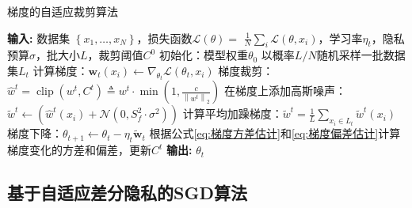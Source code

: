 \begin{algorithm}[!htb]
	\caption{梯度的自适应裁剪算法}
	\label{梯度的自适应裁剪算法}
	\begin{algorithmic}[1]
		\footnotesize
		\STATE \textbf{输入:} 数据集 $\left\{x_{1}, \ldots, x_{N}\right\}$，损失函数$\mathcal{L}(\theta)=$ $\frac{1}{N} \sum_{i} \mathcal{L}\left(\theta, x_{i}\right)$，学习率$\eta_{t}$，隐私预算$\sigma$，批大小$L$，裁剪阈值$C^{0}$
		\STATE 初始化：模型权重$\theta_{0}$
			\STATE 以概率$L / N$随机采样一批数据集$L_{t}$
				\STATE 计算梯度：$\mathbf{w}_{t}\left(x_{i}\right) \leftarrow \nabla_{\theta_{t}} \mathcal{L}\left(\theta_{t}, x_{i}\right)$
				\STATE 梯度裁剪：$\hat{w}^{t}=\operatorname{clip}\left(w^{t}, C^{t}\right) \triangleq w^{t} \cdot \min \left(1, \frac{c}{\left\|w^{t}\right\|_{2}}\right)$
				\STATE 在梯度上添加高斯噪声：$\tilde{w}^{t}\leftarrow \left(\hat{w}^{t}\left(x_{i}\right)+\mathcal{N}\left(0, S_{f}^{2} \cdot \sigma^{2}\right)\right)$
			\ENDFOR
			\STATE 计算平均加躁梯度：$\tilde{w}^{t}=\frac{1}{L} \sum_{x_{i} \in L_{t}} \tilde{w}^{t}(x_{i})$
			\STATE 梯度下降：$\theta_{t+1} \leftarrow \theta_{t}-\eta_{t} \tilde{\mathbf{w}}_{t}$
			\STATE 根据公式\ref{eq:梯度方差估计}和\ref{eq:梯度偏差估计}计算梯度变化的方差和偏差，更新$C^{t}$
		\ENDFOR
		\STATE \textbf{输出:} $\theta_{t}$
	\end{algorithmic}
\end{algorithm}

\subsection{基于自适应差分隐私的SGD算法}

